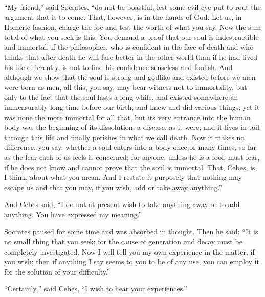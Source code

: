 \documentclass[letterpaper,12pt]{article}
\newcommand{\stephpag}[1]{\marginnote{\small\itshape\fontfamily{ppl}\selectfont #1}}
\begin{document}
\begin{drama}
``My friend,'' said Socrates, ``do not be boastful, lest some evil eye put to rout the argument that is to come. That, however, is in the hands of God. Let us, in Homeric fashion, charge the foe and test the worth of what you say. Now the sum total of what you seek is this: You demand a proof that our soul is indestructible \stephpag{c} and immortal, if the philosopher, who is confident in the face of death and who thinks that after death he will fare better in the other world than if he had lived his life differently, is not to find his confidence senseless and foolish. And although we show that the soul is strong and godlike and existed before we men were born as men, all this, you say, may bear witness not to immortality, but only to the fact that the soul lasts a long while, and existed somewhere an immeasurably long time before our birth, and knew and did various things; yet it was none the more immortal for all that, \stephpag{d} but its very entrance into the human body was the beginning of its dissolution, a disease, as it were; and it lives in toil through this life and finally perishes in what we call death. Now it makes no difference, you say, whether a soul enters into a body once or many times, so far as the fear each of us feels is concerned; for anyone, unless he is a fool, must fear, if he does not know and cannot prove that the soul is immortal. That, \stephpag{e} Cebes, is, I think, about what you mean. And I restate it purposely that nothing may escape us and that you may, if you wish, add or take away anything.''
 
And Cebes said, ``I do not at present wish to take anything away or to add anything. You have expressed my meaning.''
 
Socrates paused for some time and was absorbed in thought. Then he said: ``It is no small thing that you seek; for the cause of generation and decay must be completely investigated. \stephpag{96 a} Now I will tell you my own experience in the matter, if you wish; then if anything I say seems to you to be of any use, you can employ it for the solution of your difficulty.''
 
``Certainly,'' said Cebes, ``I wish to hear your experiences.''
 

\end{drama}
\end{document}
